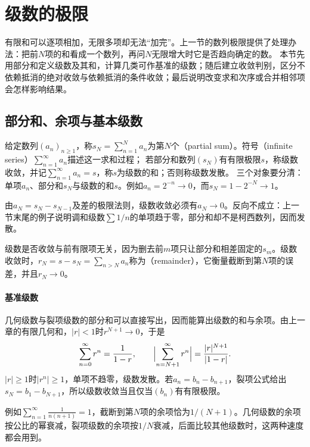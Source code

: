 \section{级数的极限}
\label{sec:ru-series}
\label{sec:analysis-series}

有限和可以逐项相加，无限多项却无法“加完”。上一节的数列极限提供了处理办法：把前$N$项的和看成一个数列，再问$N$无限增大时它是否趋向确定的数。
本节先用部分和定义级数及其和，计算几类可作基准的级数；随后建立收敛判别，区分不依赖抵消的绝对收敛与依赖抵消的条件收敛；最后说明改变求和次序或合并相邻项会怎样影响结果。

\subsection{部分和、余项与基本级数}
\label{sec:ru-partial-sums}
\label{sec:analysis-series-definition}

给定数列$(a_n)_{n\geq1}$，称$s_N=\sum_{n=1}^Na_n$为第$N$个（partial sum）。符号（infinite series）$\sum_{n=1}^\infty a_n$描述这一求和过程；
若部分和数列$(s_N)$有有限极限$s$，称级数收敛，并记$\sum_{n=1}^\infty a_n=s$，称$s$为级数的和；否则称级数发散。
三个对象要分清：单项$a_n$、部分和$s_N$与级数的和$s$。例如$a_n=2^{-n}\to0$，而$s_N=1-2^{-N}\to1$。

由$a_N=s_N-s_{N-1}$及差的极限法则，级数收敛必须有$a_N\to0$。反向不成立：上一节末尾的例子说明调和级数$\sum1/n$的单项趋于零，部分和却不是柯西数列，因而发散。

级数是否收敛与前有限项无关，因为删去前$m$项只让部分和相差固定的$s_m$。级数收敛时，$r_N=s-s_N=\sum_{n>N}a_n$称为（remainder），它衡量截断到第$N$项的误差，并且$r_N\to0$。

\paragraph{基准级数}
几何级数与裂项级数的部分和可以直接写出，因而能算出级数的和与余项。由上一章的有限几何和，$|r|<1$时$r^{N+1}\to0$，于是
\begin{equation}
 \sum_{n=0}^\infty r^n=\frac1{1-r},\qquad \Bigl|\sum_{n=N+1}^\infty r^n\Bigr|=\frac{|r|^{N+1}}{|1-r|}.
 \label{eq:analysis-geometric-series}
\end{equation}
$|r|\geq1$时$|r^n|\geq1$，单项不趋零，级数发散。若$a_n=b_n-b_{n+1}$，裂项公式给出$s_N=b_1-b_{N+1}$，所以级数收敛当且仅当$(b_n)$有有限极限。

例如$\sum_{n=1}^\infty\frac1{n(n+1)}=1$，截断到第$N$项的余项恰为$1/(N+1)$。几何级数的余项按公比的幂衰减，裂项级数的余项按$1/N$衰减，后面比较其他级数时，这两种速度都会用到。

